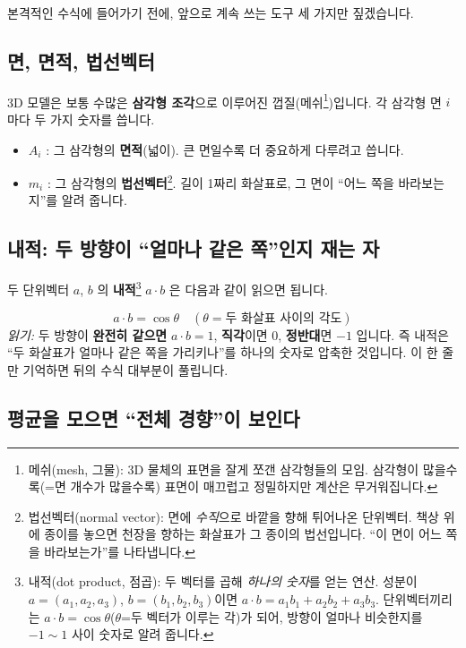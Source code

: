 \documentclass[11pt,a4paper]{article}
\begin{document}
본격적인 수식에 들어가기 전에, 앞으로 계속 쓰는 도구 세 가지만 짚겠습니다.

\subsection{면, 면적, 법선벡터}

3D 모델은 보통 수많은 \textbf{삼각형 조각}으로 이루어진 껍질(메쉬\footnote{메쉬(mesh,
그물): 3D 물체의 표면을 잘게 쪼갠 삼각형들의 모임. 삼각형이 많을수록(=면 개수가 많을수록)
표면이 매끄럽고 정밀하지만 계산은 무거워집니다.})입니다. 각 삼각형 면 $i$ 마다 두 가지
숫자를 씁니다.

\begin{itemize}[leftmargin=1.6em]
\item $A_i$ : 그 삼각형의 \textbf{면적}(넓이). 큰 면일수록 더 중요하게 다루려고 씁니다.
\item $m_i$ : 그 삼각형의 \textbf{법선벡터}\footnote{법선벡터(normal vector): 면에
\emph{수직}으로 바깥을 향해 튀어나온 단위벡터. 책상 위에 종이를 놓으면 천장을 향하는
화살표가 그 종이의 법선입니다. ``이 면이 어느 쪽을 바라보는가''를 나타냅니다.}.
길이 1짜리 화살표로, 그 면이 ``어느 쪽을 바라보는지''를 알려 줍니다.
\end{itemize}

\subsection{내적: 두 방향이 ``얼마나 같은 쪽''인지 재는 자}

두 단위벡터 $a$, $b$ 의 \textbf{내적}\footnote{내적(dot product, 점곱): 두 벡터를 곱해
\emph{하나의 숫자}를 얻는 연산. 성분이 $a=(a_1,a_2,a_3)$, $b=(b_1,b_2,b_3)$이면
$a\cdot b = a_1b_1+a_2b_2+a_3b_3$. 단위벡터끼리는 $a\cdot b=\cos\theta$($\theta$=두
벡터가 이루는 각)가 되어, 방향이 얼마나 비슷한지를 $-1\sim 1$ 사이 숫자로 알려 줍니다.}
$a\cdot b$ 은 다음과 같이 읽으면 됩니다.

\begin{equation}
a\cdot b = \cos\theta \quad(\theta = \text{두 화살표 사이의 각도})
\end{equation}
\noindent\textit{읽기:} 두 방향이 \textbf{완전히 같으면} $a\cdot b=1$, \textbf{직각}이면
$0$, \textbf{정반대}면 $-1$ 입니다. 즉 내적은 ``두 화살표가 얼마나 같은 쪽을
가리키나''를 하나의 숫자로 압축한 것입니다. 이 한 줄만 기억하면 뒤의 수식 대부분이
풀립니다.

\subsection{평균을 모으면 ``전체 경향''이 보인다}
\end{document}
